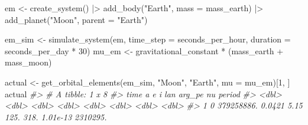 \documentclass[
  10.5pt,
  letterpaper,
]{scrbook}
\newenvironment{Shaded}{\begin{snugshade}}{\end{snugshade}}
\newcommand{\AttributeTok}[1]{\textcolor[rgb]{0.00,0.00,0.00}{#1}}
\newcommand{\CommentTok}[1]{\textcolor[rgb]{0.00,0.00,0.00}{\textit{#1}}}
\newcommand{\DecValTok}[1]{\textcolor[rgb]{0.00,0.00,0.00}{#1}}
\newcommand{\FloatTok}[1]{\textcolor[rgb]{0.00,0.00,0.00}{#1}}
\newcommand{\FunctionTok}[1]{\textcolor[rgb]{0.00,0.00,0.00}{#1}}
\newcommand{\NormalTok}[1]{\textcolor[rgb]{0.00,0.00,0.00}{#1}}
\newcommand{\OtherTok}[1]{\textcolor[rgb]{0.00,0.00,0.00}{#1}}
\newcommand{\SpecialCharTok}[1]{\textcolor[rgb]{0.00,0.00,0.00}{#1}}
\newcommand{\StringTok}[1]{\textcolor[rgb]{0.00,0.00,0.00}{#1}}
\theoremstyle{plain}
\theoremstyle{remark}
\begin{document}
\begin{Shaded}
\begin{Highlighting}[]
\NormalTok{em }\OtherTok{\textless{}{-}} \FunctionTok{create\_system}\NormalTok{() }\SpecialCharTok{|\textgreater{}}
  \FunctionTok{add\_body}\NormalTok{(}\StringTok{"Earth"}\NormalTok{, }\AttributeTok{mass =}\NormalTok{ mass\_earth) }\SpecialCharTok{|\textgreater{}}
  \FunctionTok{add\_planet}\NormalTok{(}\StringTok{"Moon"}\NormalTok{, }\AttributeTok{parent =} \StringTok{"Earth"}\NormalTok{)}

\NormalTok{em\_sim }\OtherTok{\textless{}{-}} \FunctionTok{simulate\_system}\NormalTok{(em, }\AttributeTok{time\_step =}\NormalTok{ seconds\_per\_hour,}
                          \AttributeTok{duration =}\NormalTok{ seconds\_per\_day }\SpecialCharTok{*} \DecValTok{30}\NormalTok{)}
\NormalTok{mu\_em  }\OtherTok{\textless{}{-}}\NormalTok{ gravitational\_constant }\SpecialCharTok{*}\NormalTok{ (mass\_earth }\SpecialCharTok{+}\NormalTok{ mass\_moon)}

\NormalTok{actual }\OtherTok{\textless{}{-}} \FunctionTok{get\_orbital\_elements}\NormalTok{(em\_sim, }\StringTok{"Moon"}\NormalTok{, }\StringTok{"Earth"}\NormalTok{, }\AttributeTok{mu =}\NormalTok{ mu\_em)[}\DecValTok{1}\NormalTok{, ]}
\NormalTok{actual}
\CommentTok{\#\textgreater{} \# A tibble: 1 x 8}
\CommentTok{\#\textgreater{}    time          a      e     i   lan arg\_pe       nu   period}
\CommentTok{\#\textgreater{}   \textless{}dbl\textgreater{}      \textless{}dbl\textgreater{}  \textless{}dbl\textgreater{} \textless{}dbl\textgreater{} \textless{}dbl\textgreater{}  \textless{}dbl\textgreater{}    \textless{}dbl\textgreater{}    \textless{}dbl\textgreater{}}
\CommentTok{\#\textgreater{} 1     0 379258886. 0.0421  5.15  125.   318. 1.01e{-}13 2310295.}
\end{Highlighting}
\end{Shaded}

\begin{Shaded}
\end{Shaded}
\end{document}
